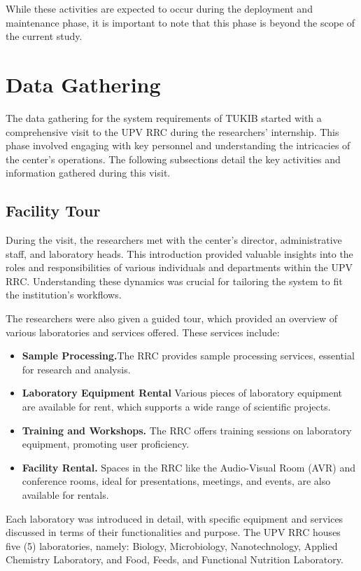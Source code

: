 While these activities are expected to occur during the deployment and maintenance phase, it is important to note that this phase is beyond the scope of the current study.

\section{Data Gathering}
The data gathering for the system requirements of TUKIB started with a comprehensive visit to the UPV RRC during the researchers' internship. This phase involved engaging with key personnel and understanding the intricacies of the center's operations. The following subsections detail the key activities and information gathered during this visit.

\subsection{Facility Tour}
During the visit, the researchers met with the center's director, administrative staff, and laboratory heads. This introduction provided valuable insights into the roles and responsibilities of various individuals and departments within the UPV RRC. Understanding these dynamics was crucial for tailoring the system to fit the institution's workflows.

The researchers were also given a guided tour, which provided an overview of various laboratories and services offered. These services include:

\begin{itemize}
	\item \textbf{Sample Processing.}The RRC provides sample processing services, essential for research and analysis.
	\item \textbf{Laboratory Equipment Rental} Various pieces of laboratory equipment are available for rent, which supports a wide range of scientific projects.
	\item \textbf{Training and Workshops.} The RRC offers training sessions on laboratory equipment, promoting user proficiency.
	\item \textbf{Facility Rental.} Spaces in the RRC like the Audio-Visual Room (AVR) and conference rooms, ideal for presentations, meetings, and events, are also available for rentals.
\end{itemize}

Each laboratory was introduced in detail, with specific equipment and services discussed in terms of their functionalities and purpose. The UPV RRC houses five (5) laboratories, namely: Biology, Microbiology, Nanotechnology, Applied Chemistry Laboratory, and Food, Feeds, and Functional Nutrition Laboratory.

